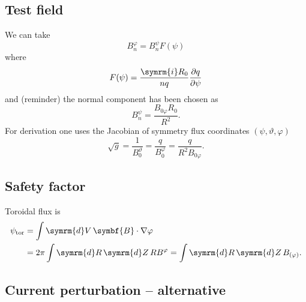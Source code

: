 \documentclass[a4paper, 10pt, english]{article}
\let\temp\vartheta
\let\vartheta\theta
\let\theta\temp
\let\temp\varphi
\let\varphi\phi
\let\phi\temp
\let\vec\symbf
\newcommand*\diff{\ensuremath{\symrm{d}}}
\newcommand*\im{\ensuremath{\symrm{i}}}
\newcommand*\pd[2][]{\ensuremath{\frac{\partial #1}{\partial #2}}}
\newcommand*\tor{\ensuremath{\textrm{tor}}}
\begin{document}
\subsection{Test field}

We can take
\[
  B_{n}^{\phi} = B_{n}^{\psi} F(\psi)
\]
where 
\[
  F(\psi) = \frac{\im R_{0}}{n q} \pd[q]{\psi}
\]
and (reminder) the normal component has been chosen as 
\[
  B_{n}^{\psi} = \frac{B_{0 \phi} R_{0}}{R^{2}}.
\]
For derivation one uses the Jacobian of symmetry flux coordinates $(\psi, \theta, \phi)$ 
\[
  \sqrt{g} = \frac{1}{B_{0}^{\theta}} = \frac{q}{B_{0}^{\phi}} = \frac{q}{R^{2} B_{0 \phi}}.
\]

\subsection{Safety factor}

Toroidal flux is
\begin{align}
  \psi_{\tor} &= \int \diff V \, \vec{B} \cdot \nabla \phi \nonumber \\
  &= 2 \pi \int \diff R \, \diff Z \, R B^{\phi} = \int \diff R \, \diff Z \, B_{(\phi)}.
\end{align}

\subsection{Current perturbation -- alternative}
\end{document}
